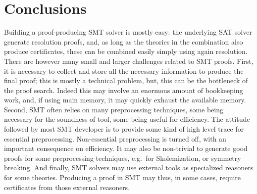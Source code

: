 \documentclass{llncs}
\begin{document}








\section{Conclusions}


Building a proof-producing SMT solver is mostly easy: the underlying SAT solver
generate resolution proofs, and, as long as the theories in the combination also
produce certificates, these can be combined easily simply using again
resolution.  There are however many small and larger challenges related to SMT
proofs.  First, it is necessary to collect and store all the necessary
information to produce the final proof; this is mostly a technical problem, but,
this can be the bottleneck of the proof search.  Indeed this may involve an
enormous amount of bookkeeping work, and, if using main memory, it may quickly
exhaust the available memory.  Second, SMT often relies on many preprocessing
techniques, some being necessary for the soundness of tool, some being useful
for efficiency.  The attitude followed by most SMT developer is to provide some
kind of high level trace for essential preprocessing.  Non-essential
preprocessing is turned off, with an important consequence on efficiency.  It
may also be non-trivial to generate good proofs for some preprocessing
techniques, e.g.\ for Skolemization, or symmetry breaking.  And finally, SMT
solvers may use external tools as specialized reasoners for some
theories. Producing a proof
in SMT may thus, in some cases, require certificates from those external
reasoners.
\end{document}
